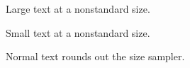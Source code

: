\documentclass{article}
\begin{document}
{\fontsize{14.5}{17}\selectfont Large text at a nonstandard size.}

{\fontsize{7.3}{9}\selectfont Small text at a nonstandard size.}

Normal text rounds out the size sampler.
\end{document}

